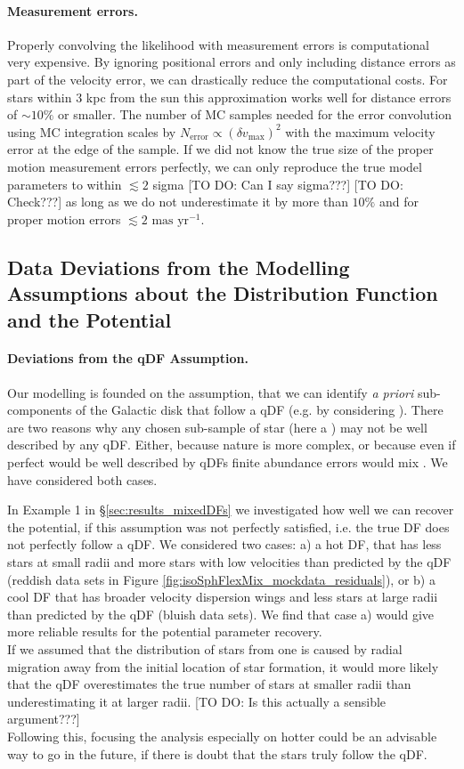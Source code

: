 \paragraph{Measurement errors.} Properly convolving the likelihood with measurement errors is computational very expensive. By ignoring positional errors and only including distance errors as part of the velocity error, we can drastically reduce the computational costs. For stars within 3 kpc from the sun this approximation works well for distance errors of $\sim 10\%$ or smaller. The number of MC samples needed for the error convolution using MC integration scales by $N_\text{error} \propto (\delta v_\text{max})^2$ with the maximum velocity error at the edge of the sample. If we did not know the true size of the proper motion measurement errors perfectly, we can only reproduce the true model parameters to within $\lesssim 2$ sigma [TO DO: Can I say sigma???] [TO DO: Check???] as long as we do not underestimate it by more than $10\%$ and for proper motion errors $\lesssim 2 \text{ mas yr}^{-1}$.

\subsection{Data Deviations from the Modelling Assumptions about the Distribution Function and the Potential}

\paragraph{Deviations from the qDF Assumption.}  Our modelling is founded on the assumption, that we can identify {\sl a priori} sub-components of the Galactic disk that follow a qDF (e.g. by considering \MAPs{}). There are two reasons why any chosen sub-sample of star (here a \MAP{}) may not be well described by any qDF. Either, because nature is more complex, or because even if perfect
\MAPs{} would be well described by qDFs finite abundance errors would mix \MAPs{}.  We have considered both cases.

 In Example 1 in \S\ref{sec:results_mixedDFs} we investigated how well we can recover the potential, if this assumption was not perfectly satisfied, i.e. the \MAPs{} true DF does not perfectly follow a qDF. We considered two cases: a) a hot DF, that has less stars at small radii and more stars with low velocities than predicted by the qDF (reddish data sets in Figure \ref{fig:isoSphFlexMix_mockdata_residuals}), or b) a cool DF that has broader velocity dispersion wings and less stars at large radii than predicted by the qDF (bluish data sets). We find that case a) would give more reliable results for the potential parameter recovery.
\\If we assumed that the distribution of stars from one \MAP{} is caused by radial migration away from the initial location of star formation, it would more likely that the qDF overestimates the true number of stars at smaller radii than underestimating it at larger radii. [TO DO: Is this actually a sensible argument???]
\\Following this, focusing the analysis especially on hotter \MAPs{} could be an advisable way to go in the future, if there is doubt that the stars truly follow the qDF.

